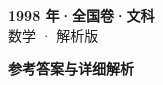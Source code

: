 \documentclass[zihao=-4, a4paper]{ctexart}
\begin{document}
\begin{center}
  {\Large\bfseries 1998 年·全国卷·文科}\\[4pt]
  {\large 数学 · 解析版}
\end{center}
\medskip
{}

\clearpage
{}
\begin{center}{\Large\bfseries 参考答案与详细解析}\end{center}
\medskip

\end{document}
